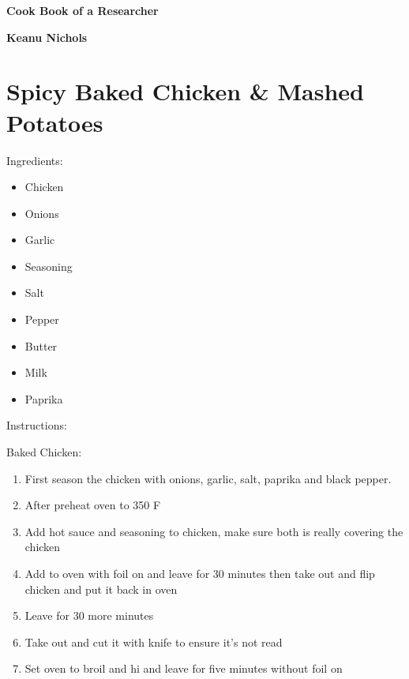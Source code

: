 \documentclass{article}
\begin{document}
\begin{titlepage}
    \begin{center}
        \vspace{1cm}

        \Large
        \flushleft\textbf{Cook Book of a Researcher}

        \vspace{1cm}
        \textbf{Keanu Nichols}
        \vspace{1cm}
        \newline
        \vfill
        \vspace{1.5cm}
    \end{center}
\end{titlepage}
\tableofcontents
\newpage


\section{Spicy Baked Chicken \& Mashed Potatoes}

Ingredients:

\begin{itemize}
    \item Chicken
    \item Onions
    \item Garlic
    \item Seasoning
    \item Salt
    \item Pepper
    \item Butter
    \item Milk
    \item Paprika
\end{itemize}

Instructions:

Baked Chicken:

\begin{enumerate}
    \item First season the chicken with onions, garlic, salt, paprika and black pepper.
    \item After preheat oven to 350 F
    \item Add hot sauce and seasoning to chicken, make sure both is really covering the chicken
    \item Add to oven with foil on and leave for 30 minutes then take out and flip chicken and put it back in oven
    \item Leave for 30 more minutes
    \item Take out and cut it with knife to ensure it's not read
    \item Set oven to broil and hi and leave for five minutes without foil on
\end{enumerate}
\end{document}
